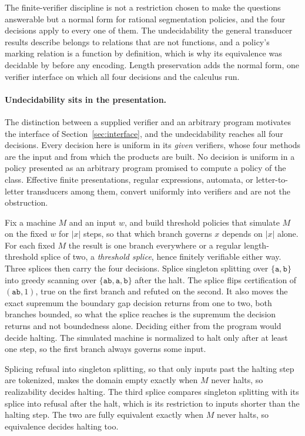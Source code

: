 \documentclass[11pt,a4paper]{article}
\theoremstyle{definition}
\theoremstyle{plain}
\newcommand{\code}[1]{\texttt{#1}}
\begin{document}
The finite-verifier discipline is not a restriction chosen to make the questions answerable but a normal form for
rational segmentation policies, and the four decisions apply to every one of them. The undecidability the general
transducer results describe belongs to relations that are not functions, and a policy's marking relation is a function
by definition, which is why its equivalence was decidable by \citet{blattner1977single} before any encoding. Length
preservation adds the normal form, one verifier interface on which all four decisions and the calculus run.

\paragraph{Undecidability sits in the presentation.} The distinction between a supplied verifier and an arbitrary
program motivates the interface of Section~\ref{sec:interface}, and the undecidability reaches all four decisions. Every
decision here is uniform in its \emph{given} verifiers, whose four methods are the input and from which the products are
built. No decision is uniform in a policy presented as an arbitrary program promised to compute a policy of the class.
Effective finite presentations, regular expressions, automata, or letter-to-letter transducers among them, convert
uniformly into verifiers and are not the obstruction.

Fix a machine $M$ and an input $w$, and build threshold policies that simulate $M$ on the fixed $w$ for $|x|$ steps, so
that which branch governs $x$ depends on $|x|$ alone. For each fixed $M$ the result is one branch everywhere or a
regular length-threshold splice of two, a \emph{threshold splice}, hence finitely verifiable either way. Three splices
then carry the four decisions. Splice singleton splitting over $\{\code{a}, \code{b}\}$ into greedy scanning over
$\{\code{ab}, \code{a}, \code{b}\}$ after the halt. The splice flips certification of $(\code{ab}, 1)$, true on the
first branch and refuted on the second. It also moves the exact supremum the boundary gap decision returns from one to
two, both branches bounded, so what the splice reaches is the supremum the decision returns and not boundedness alone.
Deciding either from the program would decide halting. The simulated machine is normalized to halt only after at least
one step, so the first branch always governs some input.

Splicing refusal into singleton splitting, so that only inputs past the halting step are tokenized, makes the domain
empty exactly when $M$ never halts, so realizability decides halting. The third splice compares singleton splitting with
its splice into refusal after the halt, which is its restriction to inputs shorter than the halting step. The two are
fully equivalent exactly when $M$ never halts, so equivalence decides halting too.
\end{document}

